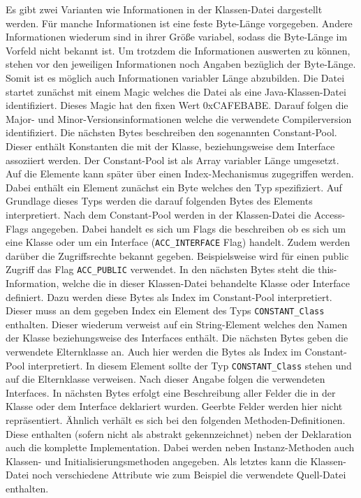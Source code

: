 \documentclass[conference]{IEEEtran}
\begin{document}
Es gibt zwei Varianten wie Informationen in der Klassen-Datei dargestellt werden. Für manche Informationen ist eine feste Byte-Länge vorgegeben. Andere Informationen wiederum sind in ihrer Größe variabel, sodass die Byte-Länge im Vorfeld nicht bekannt ist. Um trotzdem die Informationen auswerten zu können, stehen vor den jeweiligen Informationen noch Angaben bezüglich der Byte-Länge. Somit ist es möglich auch Informationen variabler Länge abzubilden.
Die Datei startet zunächst mit einem Magic welches die Datei als eine Java-Klassen-Datei identifiziert. Dieses Magic hat den fixen Wert 0xCAFEBABE. Darauf folgen die Major- und Minor-Versionsinformationen welche die verwendete Compilerversion identifiziert. Die nächsten Bytes beschreiben den sogenannten Constant-Pool. Dieser enthält Konstanten die mit der Klasse, beziehungsweise dem Interface assoziiert werden. Der Constant-Pool ist als Array variabler Länge umgesetzt. Auf die Elemente kann später über einen Index-Mechanismus zugegriffen werden. Dabei enthält ein Element zunächst ein Byte welches den Typ spezifiziert. Auf Grundlage dieses Typs werden die darauf folgenden Bytes des Elements interpretiert. Nach dem Constant-Pool werden in der Klassen-Datei die Access-Flags angegeben. Dabei handelt es sich um Flags die beschreiben ob es sich um eine Klasse oder um ein Interface (\verb|ACC_INTERFACE| Flag) handelt. Zudem werden darüber die Zugriffsrechte bekannt gegeben. Beispielsweise wird für einen public Zugriff das Flag \verb|ACC_PUBLIC| verwendet. In den nächsten Bytes steht die this-Information, welche die in dieser Klassen-Datei behandelte Klasse oder Interface definiert. Dazu werden diese Bytes als Index im Constant-Pool interpretiert. Dieser muss an dem gegeben Index ein Element des Typs \verb|CONSTANT_Class| enthalten. Dieser wiederum verweist auf ein String-Element welches den Namen der Klasse beziehungsweise des Interfaces enthält. Die nächsten Bytes geben die verwendete Elternklasse an. Auch hier werden die Bytes als Index im Constant-Pool interpretiert. In diesem Element sollte der Typ \verb|CONSTANT_Class| stehen und auf die Elternklasse verweisen. Nach dieser Angabe folgen die verwendeten Interfaces. In nächsten Bytes erfolgt eine Beschreibung aller Felder die in der Klasse oder dem Interface deklariert wurden. Geerbte Felder werden hier nicht repräsentiert. Ähnlich verhält es sich bei den folgenden Methoden-Definitionen. Diese enthalten (sofern nicht als abstrakt gekennzeichnet) neben der Deklaration auch die komplette Implementation. Dabei werden neben Instanz-Methoden auch Klassen- und Initialisierungsmethoden angegeben. Als letztes kann die Klassen-Datei noch verschiedene Attribute wie zum Beispiel die verwendete Quell-Datei enthalten. \cite{Venners.1996b} \cite{Lindholm.21.08.2018}
\end{document}
